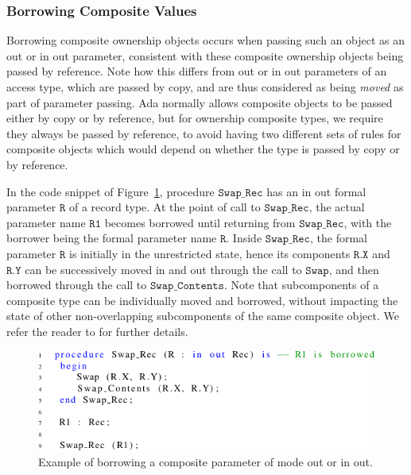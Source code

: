 \documentclass{llncs}
\newcommand\var[1]{\ensuremath{\mathtt{#1}}}
\newcommand{\keyword}[1]{\textsf{#1}}
\begin{document}
\subsubsection{Borrowing Composite Values}
\label{subsubsec:borrowComposite}

Borrowing composite ownership objects occurs when passing such an object as an \keyword{out} or \keyword{in out} parameter, consistent with
these composite ownership objects being passed by reference. Note how this differs from \keyword{out} or \keyword{in out} parameters of an access type, which are passed by copy,
and are thus considered as being \textit{moved} as part of parameter passing. Ada normally allows composite objects to be passed either by copy or by reference, but for ownership composite types, we require they always be passed by reference, to avoid having two different sets of rules for composite objects which would depend on whether the type is passed by copy or by reference.

In the code snippet of Figure~\ref{fig:borrowingComposite}, procedure \var{Swap\_Rec} has an \keyword{in out} formal parameter \var{R} of a record type. At the point of
call to \var{Swap\_Rec}, the actual parameter name \var{R1} becomes borrowed until returning from \var{Swap\_Rec}, with the borrower being the formal parameter name \var{R}.  Inside \var{Swap\_Rec}, the formal parameter \var{R} is initially
in the unrestricted state, hence its components \var{R.X} and \var{R.Y} can be successively moved in and out through the call to \var{Swap}, and then borrowed through the call to \var{Swap\_Contents}.
Note that subcomponents of a composite type can be individually moved and borrowed, without impacting the state of other non-overlapping subcomponents of the same composite object.
We refer the reader to \cite{AI2018} for further details.

\begin{figure}[htb!]
\centering
   \includegraphics[]{borrowingComposite}
   \caption{Example of borrowing a composite parameter of mode \keyword{out} or \keyword{in out}.}
   \label{fig:borrowingComposite}
\end{figure}
\end{document}
